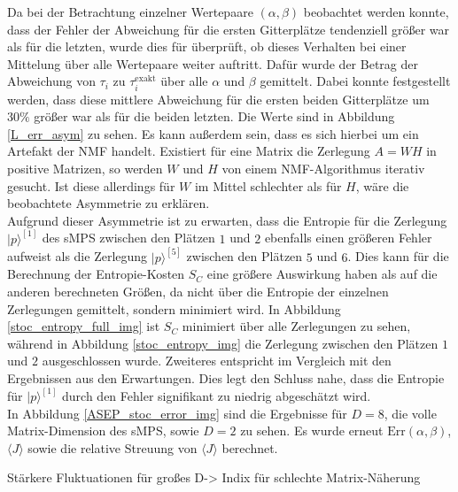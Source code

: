 \documentclass[10pt,a4paper]{report}
\begin{document}
Da bei der Betrachtung einzelner Wertepaare $(\alpha,\beta)$ beobachtet werden konnte, dass der Fehler der Abweichung für die ersten Gitterplätze tendenziell größer war als für die letzten, wurde dies für überprüft, ob dieses Verhalten bei einer Mittelung über alle Wertepaare weiter auftritt. Dafür wurde der Betrag der Abweichung von $\tau_i$ zu $\tau_i^{\text{exakt}}$ über alle $\alpha$ und $\beta$ gemittelt. Dabei konnte festgestellt werden, dass diese mittlere Abweichung für die ersten beiden Gitterplätze um $30\%$ größer war als für die beiden letzten. Die Werte sind in Abbildung \ref{L_err_asym} zu sehen. Es kann außerdem sein, dass es sich hierbei um ein Artefakt der NMF handelt. Existiert für eine Matrix die Zerlegung $A=WH$ in positive Matrizen, so werden $W$ und $H$ von einem NMF-Algorithmus iterativ gesucht.\cite{MPS-vs-sMPS} Ist diese allerdings für  $W$ im Mittel schlechter als für $H$, wäre die beobachtete Asymmetrie zu erklären.\\


Aufgrund dieser Asymmetrie ist zu erwarten, dass die Entropie für die Zerlegung $|p\rangle^{[1]}$ des sMPS zwischen den Plätzen $1$ und $2$ ebenfalls einen größeren Fehler aufweist als die Zerlegung $|p\rangle^{[5]}$ zwischen den Plätzen $5$ und $6$. Dies kann für die Berechnung der Entropie-Kosten $S_C$ eine größere Auswirkung haben als auf die anderen berechneten Größen, da nicht über die Entropie der einzelnen Zerlegungen gemittelt, sondern minimiert wird. In Abbildung \ref{stoc_entropy_full_img} ist $S_C$ minimiert über alle Zerlegungen zu sehen, während in Abbildung \ref{stoc_entropy_img} die Zerlegung zwischen den Plätzen $1$ und $2$ ausgeschlossen wurde. Zweiteres entspricht im Vergleich mit den Ergebnissen aus \cite{sMPS} den Erwartungen. Dies legt den Schluss nahe, dass die Entropie für $|p\rangle^{[1]}$ durch den Fehler signifikant zu niedrig abgeschätzt wird.\\

In Abbildung \ref{ASEP_stoc_error_img} sind die Ergebnisse für $D=8$, die volle Matrix-Dimension des sMPS, sowie $D=2$ zu sehen. Es wurde erneut $\text{Err}(\alpha,\beta)$, $\langle J\rangle$ sowie die relative Streuung von $\langle J\rangle$ berechnet.

Stärkere Fluktuationen für großes D-> Indix für schlechte Matrix-Näherung
\end{document}
